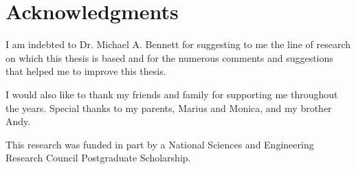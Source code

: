 
\chapter{Acknowledgments}

I am indebted to Dr. Michael A. Bennett for suggesting to me the line of research on which this thesis is based and for the numerous comments and suggestions that helped me to improve this thesis. 

I would also like to thank my friends and family for supporting me throughout the years. Special thanks to my parents, Marius and Monica, and my brother Andy. 

This research was funded in part by a National Sciences and Engineering Research Council Postgraduate Scholarship.

\endinput

Thank those people who helped you. 

Don't forget your parents or loved ones.

You may wish to acknowledge your funding sources.
